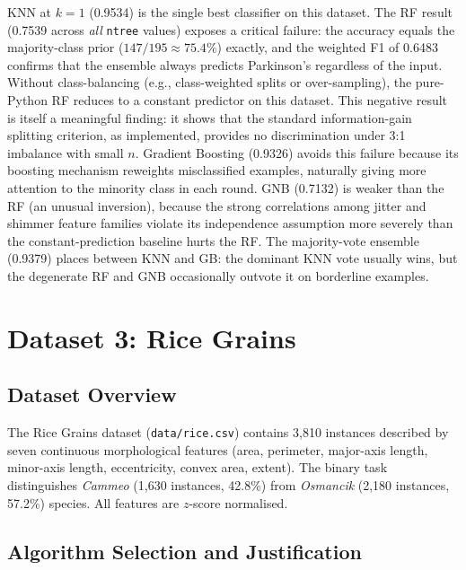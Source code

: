 \documentclass[11pt,letterpaper]{article}
\begin{document}
KNN at $k=1$ (0.9534) is the single best classifier on this dataset.
The RF result (0.7539 across \emph{all} \texttt{ntree} values) exposes a
critical failure: the accuracy equals the majority-class prior
($147/195 \approx 75.4\%$) exactly, and the weighted F1 of 0.6483 confirms
that the ensemble always predicts Parkinson's regardless of the input.
Without class-balancing (e.g., class-weighted splits or over-sampling),
the pure-Python RF reduces to a constant predictor on this dataset.  This
negative result is itself a meaningful finding: it shows that the standard
information-gain splitting criterion, as implemented, provides no
discrimination under 3:1 imbalance with small $n$.  Gradient Boosting
(0.9326) avoids this failure because its boosting mechanism reweights
misclassified examples, naturally giving more attention to the minority class
in each round.  GNB (0.7132) is weaker than the RF (an unusual inversion),
because the strong correlations among jitter and shimmer feature families
violate its independence assumption more severely than the constant-prediction
baseline hurts the RF.  The majority-vote ensemble (0.9379) places between
KNN and GB: the dominant KNN vote usually wins, but the degenerate RF and GNB
occasionally outvote it on borderline examples.

\section{Dataset 3: Rice Grains}

\subsection{Dataset Overview}

The Rice Grains dataset (\texttt{data/rice.csv}) contains 3,810 instances
described by seven continuous morphological features (area, perimeter,
major-axis length, minor-axis length, eccentricity, convex area, extent).
The binary task distinguishes \textit{Cammeo} (1,630 instances, 42.8\%) from
\textit{Osmancik} (2,180 instances, 57.2\%) species.  All features are
$z$-score normalised.

\subsection{Algorithm Selection and Justification}
\end{document}
